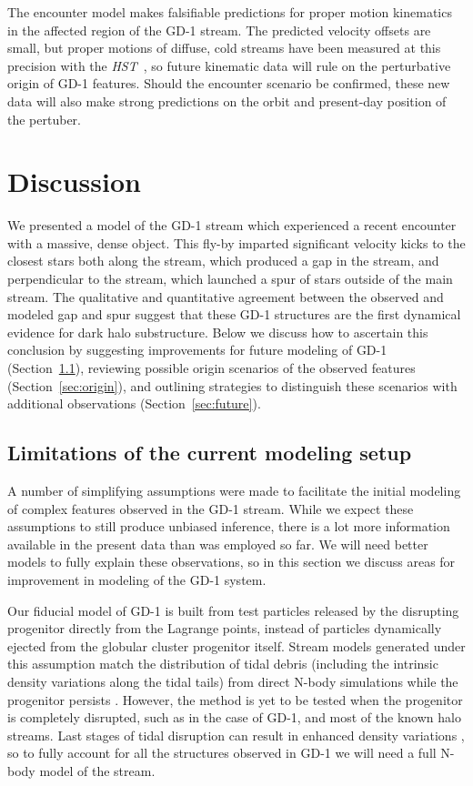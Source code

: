 \documentclass[twocolumn]{aastex62}
\newcommand{\hst}{\textsl{HST}}
\begin{document}
The encounter model makes falsifiable predictions for proper motion kinematics in the affected region of the GD-1 stream.
The predicted velocity offsets are small, but proper motions of diffuse, cold streams have been measured at this precision with the \hst\ \citep{sohn2016}, so future kinematic data will rule on the perturbative origin of GD-1 features.
Should the encounter scenario be confirmed, these new data will also make strong predictions on the orbit and present-day position of the pertuber.


\section{Discussion}
\label{sec:discussion}
We presented a model of the GD-1 stream which experienced a recent encounter with a massive, dense object.
This fly-by imparted significant velocity kicks to the closest stars both along the stream, which produced a gap in the stream, and perpendicular to the stream, which launched a spur of stars outside of the main stream.
The qualitative and quantitative agreement between the observed and modeled gap and spur suggest that these GD-1 structures are the first dynamical evidence for dark halo substructure.
Below we discuss how to ascertain this conclusion by suggesting improvements for future modeling of GD-1 (Section~\ref{sec:caveats}), reviewing possible origin scenarios of the observed features (Section~\ref{sec:origin}), and outlining strategies to distinguish these scenarios with additional observations (Section~\ref{sec:future}).

\subsection{Limitations of the current modeling setup}
\label{sec:caveats}
A number of simplifying assumptions were made to facilitate the initial modeling of complex features observed in the GD-1 stream.
While we expect these assumptions to still produce unbiased inference, there is a lot more information available in the present data than was employed so far.
We will need better models to fully explain these observations, so in this section we discuss areas for improvement in modeling of the GD-1 system.

Our fiducial model of GD-1 is built from test particles released by the disrupting progenitor directly from the Lagrange points, instead of particles dynamically ejected from the globular cluster progenitor itself.
Stream models generated under this assumption match the distribution of tidal debris (including the intrinsic density variations along the tidal tails) from direct N-body simulations while the progenitor persists \citep[e.g.,][]{kupper2012,fardal2015}.
However, the method is yet to be tested when the progenitor is completely disrupted, such as in the case of GD-1, and most of the known halo streams.
Last stages of tidal disruption can result in enhanced density variations \citep[e.g., for an exoplanet disruption, see][]{}, so to fully account for all the structures observed in GD-1 we will need a full N-body model of the stream.
\end{document}
